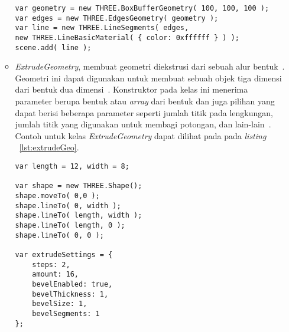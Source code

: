 \begin{itemize}
\begin{itemize}
\begin{lstlisting}[caption={Contoh penggunaan kelas {\it EdgesGeometry}.}, label={lst:edgesGeo},captionpos=b]
var geometry = new THREE.BoxBufferGeometry( 100, 100, 100 );
var edges = new THREE.EdgesGeometry( geometry );
var line = new THREE.LineSegments( edges,
new THREE.LineBasicMaterial( { color: 0xffffff } ) );
scene.add( line );
\end{lstlisting}
		\item {\it ExtrudeGeometry}, membuat geometri diekstrusi dari sebuah alur bentuk~\cite{threejs}. Geometri ini dapat digunakan untuk membuat sebuah objek tiga dimensi dari bentuk dua dimensi~\cite{learningThreejs}. Konstruktor pada kelas ini menerima parameter berupa bentuk atau {\it array} dari bentuk dan juga pilihan yang dapat berisi beberapa parameter seperti jumlah titik pada lengkungan, jumlah titik yang digunakan untuk membagi potongan, dan lain-lain~\cite{threejs}. Contoh untuk kelas {\it ExtrudeGeometry} dapat dilihat pada pada {\it listing} ~\ref{lst:extrudeGeo}.
	
\begin{lstlisting}[caption={Contoh penggunaan kelas {\it ExtrudeGeometry}.}, label={lst:extrudeGeo},captionpos=b]
var length = 12, width = 8;

var shape = new THREE.Shape();
shape.moveTo( 0,0 );
shape.lineTo( 0, width );
shape.lineTo( length, width );
shape.lineTo( length, 0 );
shape.lineTo( 0, 0 );

var extrudeSettings = {
	steps: 2,
	amount: 16,
	bevelEnabled: true,
	bevelThickness: 1,
	bevelSize: 1,
	bevelSegments: 1
};


\end{lstlisting}
\end{itemize}
\end{itemize}
